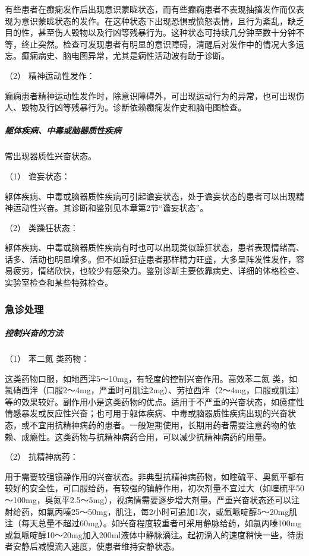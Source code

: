 有些患者在癫痫发作后出现意识蒙眬状态，而有些癫痫患者不表现抽搐发作而仅表现为意识蒙眬状态的发作。在这种状态下出现恐惧或愤怒表情，且行为紊乱，缺乏目的性，甚至伤人毁物以及行凶等残暴行为。这种状态可持续几分钟至数十分钟不等，终止突然。检查可发现患者有明显的意识障碍，清醒后对发作中的情况大多遗忘。癫痫病史、脑电图异常，尤其是痫性活动波有助于诊断。

\hypertarget{text00043.htmlux5cux23CHP1-18-1-2-7-2}{}
（2） 精神运动性发作：

癫痫患者精神运动性发作时，除意识障碍外，可出现运动行为的异常，也可出现伤人、毁物及行凶等残暴行为。诊断依赖癫痫发作史和脑电图检查。

\subparagraph{躯体疾病、中毒或脑器质性疾病}

常出现器质性兴奋状态。

\hypertarget{text00043.htmlux5cux23CHP1-18-1-2-8-1}{}
（1） 谵妄状态：

躯体疾病、中毒或脑器质性疾病可引起谵妄状态，处于谵妄状态的患者可以出现精神运动性兴奋。其诊断和鉴别见本章第2节“谵妄状态”。

\hypertarget{text00043.htmlux5cux23CHP1-18-1-2-8-2}{}
（2） 类躁狂状态：

躯体疾病、中毒或脑器质性疾病有时也可以出现类似躁狂状态，患者表现情绪高、话多、活动也明显增多。但不如躁狂症患者那样精力旺盛，大多呈阵发性发作，容易疲劳，情绪欣快，也较少有感染力。鉴别诊断主要依靠病史、详细的体格检查、实验室检查和某些特殊检查。

\subsubsection{急诊处理}

\subparagraph{控制兴奋的方法}

\hypertarget{text00043.htmlux5cux23CHP1-18-1-3-1-1}{}
（1） 苯二氮{} 类药物：

这类药物口服，如地西泮5～10mg，有轻度的控制兴奋作用。高效苯二氮{}
类，如氯硝西泮（口服2～4mg，严重时可肌注2mg）、劳拉西泮（2～4mg，口服或肌注）等的效果较好。副作用小是这类药物的优点。适用于不严重的兴奋状态，如癔症性情感暴发或反应性兴奋；也可用于躯体疾病、中毒或脑器质性疾病出现的兴奋状态，或不宜用抗精神病药的患者。一般短期使用，长期用药者需要注意药物的依赖、成瘾性。这类药物与抗精神病药合用，可以减少抗精神病药的用量。

\hypertarget{text00043.htmlux5cux23CHP1-18-1-3-1-2}{}
（2） 抗精神病药：

用于需要较强镇静作用的兴奋状态。非典型抗精神病药物，如喹硫平、奥氮平都有较好的安全性，可口服给药，有较强的镇静作用，初次剂量不宜过大（如喹硫平50～100mg，奥氮平2.5～5mg），视病情需要逐步增大剂量。严重兴奋状态还可以注射给药，如氯丙嗪25～50mg，肌注，每2小时可追加1次，或氟哌啶醇5～20mg肌注（每天总量不超过60mg）。如兴奋程度较重者可采用静脉给药，如氯丙嗪100mg或氟哌啶醇10～20mg加入200ml液体中静脉滴注。起初滴入的速度稍快一些，待患者安静后减慢滴入速度，使患者维持安静状态。

